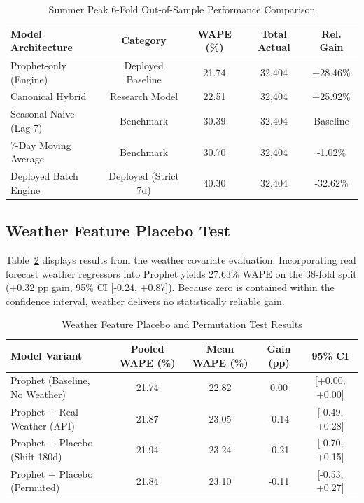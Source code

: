 \documentclass[conference]{IEEEtran}
\begin{document}
\begin{table}[!t]
\centering
\caption{Summer Peak 6-Fold Out-of-Sample Performance Comparison}
\label{tab:summer}
\footnotesize
\setlength{\tabcolsep}{3.5pt}
\begin{tabular}{lcccc}
\toprule
\textbf{Model Architecture} & \textbf{Category} & \textbf{WAPE (\%)} & \textbf{Total Actual} & \textbf{Rel. Gain} \\
\midrule
Prophet-only (Engine) & Deployed Baseline & 21.74 & 32,404 & +28.46\% \\
Canonical Hybrid & Research Model & 22.51 & 32,404 & +25.92\% \\
Seasonal Naive (Lag 7) & Benchmark & 30.39 & 32,404 & Baseline \\
7-Day Moving Average & Benchmark & 30.70 & 32,404 & -1.02\% \\
Deployed Batch Engine & Deployed (Strict 7d) & 40.30 & 32,404 & -32.62\% \\
\bottomrule
\end{tabular}
\end{table}

\subsection{Weather Feature Placebo Test}
Table~\ref{tab:weather} displays results from the weather covariate evaluation. Incorporating real forecast weather regressors into Prophet yields 27.63\% WAPE on the 38-fold split (+0.32 pp gain, 95\% CI [-0.24, +0.87]). Because zero is contained within the confidence interval, weather delivers no statistically reliable gain.

\begin{table}[!t]
\centering
\caption{Weather Feature Placebo and Permutation Test Results}
\label{tab:weather}
\footnotesize
\setlength{\tabcolsep}{2.5pt}
\begin{tabular}{lcccc}
\toprule
\textbf{Model Variant} & \textbf{Pooled WAPE (\%)} & \textbf{Mean WAPE (\%)} & \textbf{Gain (pp)} & \textbf{95\% CI} \\
\midrule
Prophet (Baseline, No Weather) & 21.74 & 22.82 & 0.00 & [+0.00, +0.00] \\
Prophet + Real Weather (API) & 21.87 & 23.05 & -0.14 & [-0.49, +0.28] \\
Prophet + Placebo (Shift 180d) & 21.94 & 23.24 & -0.21 & [-0.70, +0.15] \\
Prophet + Placebo (Permuted) & 21.84 & 23.10 & -0.11 & [-0.53, +0.27] \\
\bottomrule
\end{tabular}
\end{table}
\end{document}
